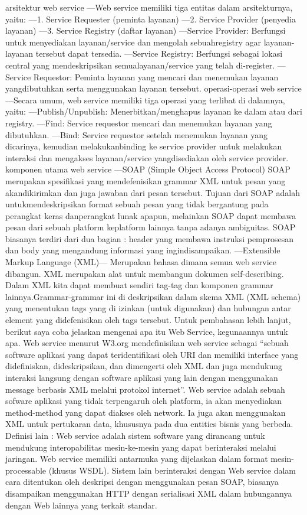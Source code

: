 \documentclass[a4paper,11pt]{book}
\begin{document}
arsitektur web service
—Web service memiliki tiga entitas dalam arsitekturnya, yaitu:
—1.  Service Requester (peminta layanan)
—2.  Service Provider (penyedia layanan)
—3.  Service Registry (daftar layanan)
—Service Provider: Berfungsi untuk menyediakan layanan/service dan mengolah sebuahregistry agar layanan-layanan tersebut dapat tersedia.
—Service Registry: Berfungsi sebagai lokasi central yang mendeskripsikan semualayanan/service yang telah di-register.
—Service Requestor: Peminta layanan yang mencari dan menemukan layanan yangdibutuhkan serta menggunakan layanan tersebut.
operasi-operasi web service
—Secara umum, web service memiliki tiga operasi yang terlibat di dalamnya, yaitu:
—Publish/Unpublish: Menerbitkan/menghapus layanan ke dalam atau dari registry.
—Find: Service requestor mencari dan menemukan layanan yang dibutuhkan.
—Bind: Service requestor setelah menemukan layanan yang dicarinya, kemudian melakukanbinding ke service provider untuk melakukan interaksi dan mengakses layanan/service yangdisediakan oleh service provider.
komponen utama web service
—SOAP (Simple Object Access Protocol)
  SOAP merupakan spesifikasi yang mendefenisikan grammar XML untuk pesan yang akandikirimkan dan juga jawaban dari pesan tersebut. Tujuan dari SOAP adalah untukmendeskripsikan format sebuah pesan yang tidak bergantung pada perangkat keras danperangkat lunak apapun, melainkan SOAP dapat membawa pesan dari sebuah platform keplatform lainnya tanpa adanya ambiguitas. SOAP biasanya terdiri dari dua bagian : header yang membawa instruksi pemprosesan dan body yang mengandung informasi yang ingindisampaikan.
—Extensible Markup Language (XML)— Merupakan bahasa dimana semua web service dibangun. XML merupakan alat untuk membangun dokumen self-describing. Dalam XML kita dapat membuat sendiri tag-tag dan komponen grammar lainnya.Grammar-grammar ini di deskripsikan dalam skema XML (XML schema) yang menentukan tags yang di izinkan (untuk digunakan) dan hubungan antar element yang didefenisikan oleh tags tersebut.
Untuk pembahasan lebih lanjut, berikut saya coba jelaskan mengenai apa itu Web Service,  kegunaannya untuk apa.
Web service menurut W3.org mendefinisikan web service sebagai “sebuah software aplikasi yang dapat teridentifikasi oleh URI dan memiliki interface yang didefiniskan, dideskripsikan, dan dimengerti oleh XML dan juga mendukung interaksi langsung dengan software aplikasi yang lain dengan menggunakan message berbasis XML melalui protokol internet”.
Web service adalah sebuah sofware aplikasi yang tidak terpengaruh oleh platform, ia akan menyediakan method-method yang dapat diakses oleh network. Ia juga akan menggunakan XML untuk pertukaran data, khususnya pada dua entities bisnis yang berbeda.
Definisi lain : Web service  adalah sistem software yang dirancang untuk mendukung interopabilitas mesin-ke-mesin yang dapat berinteraksi melalui jaringan.  Web service memiliki antarmuka yang dijelaskan dalam format mesin-processable (khusus WSDL). Sistem lain berinteraksi dengan  Web service dalam cara ditentukan oleh deskripsi dengan menggunakan pesan SOAP, biasanya disampaikan menggunakan HTTP dengan serialisasi XML dalam hubungannya dengan Web lainnya yang terkait standar.
\end{document}
